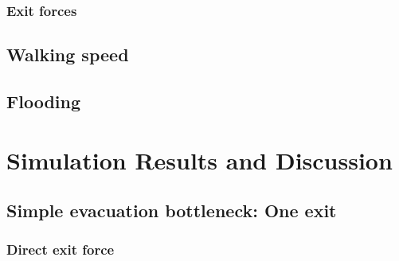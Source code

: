 \documentclass[11pt]{article}
\begin{document}
\subsubsection{Exit forces}


\subsection{Walking speed}

\subsection{Flooding}



\section{Simulation Results and Discussion}

\subsection{Simple evacuation bottleneck: One exit}

\subsubsection{Direct exit force}
\end{document}
